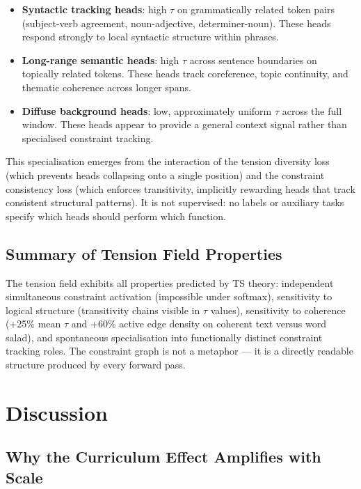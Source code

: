 \documentclass[10pt,a4paper]{article}
\begin{document}
\begin{itemize}
    \item \textbf{Syntactic tracking heads}: high $\tau$ on grammatically related token pairs (subject-verb agreement, noun-adjective, determiner-noun). These heads respond strongly to local syntactic structure within phrases.
    \item \textbf{Long-range semantic heads}: high $\tau$ across sentence boundaries on topically related tokens. These heads track coreference, topic continuity, and thematic coherence across longer spans.
    \item \textbf{Diffuse background heads}: low, approximately uniform $\tau$ across the full window. These heads appear to provide a general context signal rather than specialised constraint tracking.
\end{itemize}

This specialisation emerges from the interaction of the tension diversity loss (which prevents heads collapsing onto a single position) and the constraint consistency loss (which enforces transitivity, implicitly rewarding heads that track consistent structural patterns). It is not supervised: no labels or auxiliary tasks specify which heads should perform which function.

\subsection{Summary of Tension Field Properties}

The tension field exhibits all properties predicted by TS theory: independent simultaneous constraint activation (impossible under softmax), sensitivity to logical structure (transitivity chains visible in $\tau$ values), sensitivity to coherence (+25\% mean $\tau$ and +60\% active edge density on coherent text versus word salad), and spontaneous specialisation into functionally distinct constraint tracking roles. The constraint graph is not a metaphor --- it is a directly readable structure produced by every forward pass.

\section{Discussion}

\subsection{Why the Curriculum Effect Amplifies with Scale}
\end{document}
